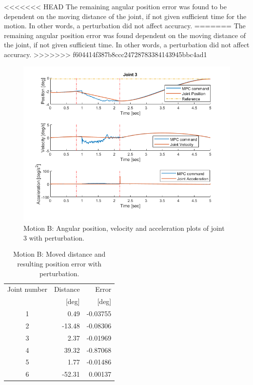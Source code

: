 \documentclass[final]{LTHtwocol} %
\begin{document}
<<<<<<< HEAD
The remaining angular position error was found to be dependent on the moving distance of the joint, if not given sufficient time for the motion. In other words, a perturbation did not affect accuracy.
=======
The remaining angular position error was found dependent on the moving distance of the joint, if not given sufficient time. In other words, a perturbation did not affect accuracy.
>>>>>>> f604414f387b8ccc24728783384143945bbc4ad1

\begin{figure}
    \centering
    \includegraphics[width=\linewidth]{result_under_perturbation_Joint3.png}
    \caption{Motion B: Angular position, velocity and acceleration plots of joint 3 with perturbation.}
    \label{fig:joint_result_w_perturbation}
\end{figure}

\begin{table}[t]
	\centering
	\caption{Motion B: Moved distance and resulting position error with perturbation.}
	\label{tab:joint_result_w_perturbation}
	\begin{tabular}{crr} %
		\toprule
		Joint number & Distance & Error \\ 
		 &  [deg] & [deg] \\ 
        \midrule
		1 & 0.49    & -0.03755 \\
		2 & -13.48  & -0.08306\\
		3 & 2.37    & -0.01969 \\
		4 & 39.32   & -0.87068 \\
		5 & 1.77    & -0.01486 \\
		6 & -52.31  & 0.00137 \\  
        \bottomrule 
	\end{tabular}
\end{table}
\end{document}
